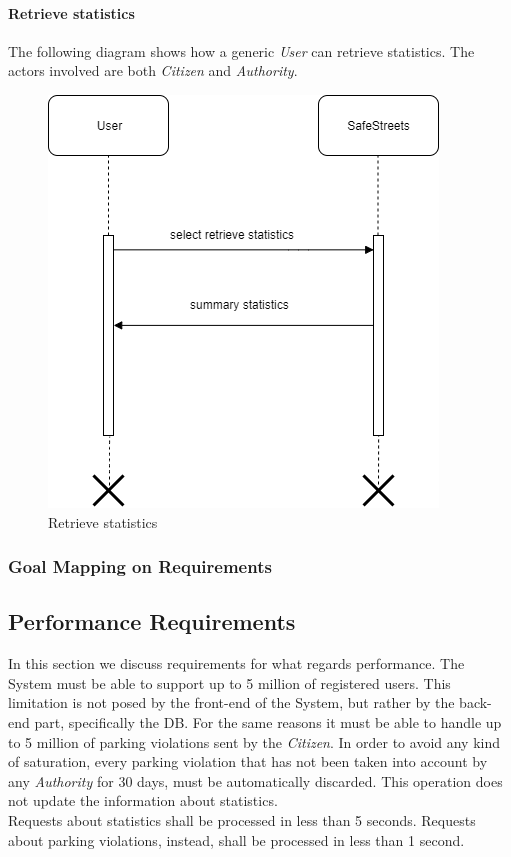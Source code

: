 \documentclass{article}
\begin{document}
\paragraph{Retrieve statistics}
The following diagram shows how a generic \textit{User} can retrieve statistics. The actors involved
are both \textit{Citizen} and \textit{Authority}.  
\begin{figure}[H]
    \centering
    \includegraphics[scale=0.5]{img/sequence_diagrams/retrieve_statistics.png}
    \caption{Retrieve statistics}
\end{figure}


\subsubsection{Goal Mapping on Requirements}

\subsection{Performance Requirements}
In this section we discuss requirements for what regards performance. The System must be able to support up to
5 million of registered users. This limitation is not posed by the front-end of the System, but rather by the 
back-end part, specifically the DB. For the same reasons it must be able to handle up to 5 million of parking violations 
sent by the \textit{Citizen}. In order to avoid any kind of saturation, every parking violation that has not been taken into account
by any \textit{Authority} for 30 days, must be automatically discarded. This operation does not update the information about 
statistics.
 \\Requests about statistics shall be processed in less than 5 seconds. Requests about parking violations, instead, shall be processed 
 in less than 1 second.     
\end{document}
